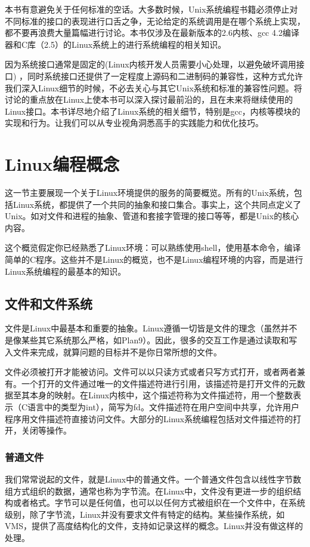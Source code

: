 本书有意避免关于任何标准的空话。大多数时候，Unix系统编程书籍必须停止对不同标准的接口的表现进行口舌之争，无论给定的系统调用是在哪个系统上实现，都不要再浪费大量篇幅进行讨论。本书仅涉及在最新版本的2.6内核、gcc 4.2编译器和C库（2.5）的Linux系统上的进行系统编程的相关知识。

因为系统接口通常是固定的(Linux内核开发人员需要小心处理，以避免破坏调用接口) ，同时系统接口还提供了一定程度上源码和二进制码的兼容性，这种方式允许我们深入Linux细节的时候，不必去关心与其它Unix系统和标准的兼容性问题。将讨论的重点放在Linux上使本书可以深入探讨最前沿的，且在未来将继续使用的Linux接口。本书详尽地介绍了Linux系统的相关细节，特别是gcc，内核等模块的实现和行为。让我们可以从专业视角洞悉高手的实践能力和优化技巧。 


\section{Linux编程概念}
这一节主要展现一个关于Linux环境提供的服务的简要概览。所有的Unix系统，包括Linux系统，都提供了一个共同的抽象和接口集合。事实上，这个共同点定义了Unix。如对文件和进程的抽象、管道和套接字管理的接口等等，都是Unix的核心内容。

这个概览假定你已经熟悉了Linux环境：可以熟练使用shell，使用基本命令，编译简单的C程序。这些并不是Linux的概览，也不是Linux编程环境的内容，而是进行Linux系统编程的最基本的知识。

\subsection{文件和文件系统}

文件是Linux中最基本和重要的抽象。Linux遵循一切皆是文件的理念（虽然并不是像某些其它系统那么严格，如Plan9）。因此，很多的交互工作是通过读取和写入文件来完成，就算问题的目标并不是你日常所想的文件。

文件必须被打开才能被访问。文件可以以只读方式或者只写方式打开，或者两者兼有。一个打开的文件通过唯一的文件描述符进行引用，该描述符是打开文件的元数据至其本身的映射。在Linux内核中，这个描述符称为文件描述符，用一个整数表示（C语言中的类型为int），简写为fd。文件描述符在用户空间中共享，允许用户程序用文件描述符直接访问文件。大部分的Linux系统编程包括对文件描述符的打开，关闭等操作。

\subsubsection{普通文件}

我们常常说起的文件，就是Linux中的普通文件。一个普通文件包含以线性字节数组方式组织的数据，通常也称为字节流。在Linux中，文件没有更进一步的组织结构或者格式。字节可以是任何值，也可以以任何方式被组织在一个文件中，在系统级别，除了字节流，Linux并没有要求文件有特定的结构。某些操作系统，如VMS，提供了高度结构化的文件，支持如记录这样的概念。Linux并没有做这样的处理。

